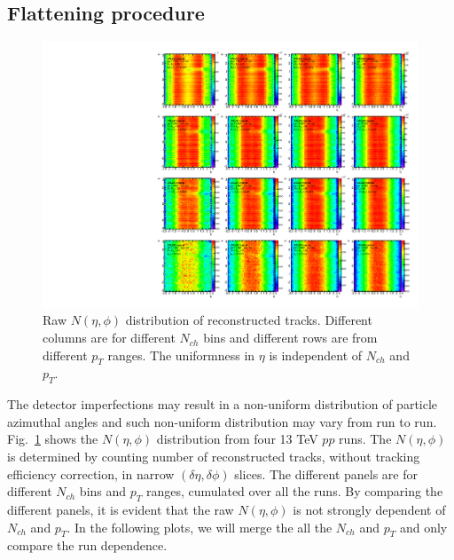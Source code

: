 \subsection{Flattening procedure}
\begin{figure}[H]
\centering
\includegraphics[width=1.\linewidth]{figs/sec_ana/flatten_pp13_2D_wPt.pdf}
\caption{Raw $N(\eta,\phi)$ distribution of reconstructed tracks. Different columns are for different $N_{ch}$ bins and different rows are from different $p_{T}$ ranges. The uniformness in $\eta$ is independent of $N_{ch}$ and $p_{T}$.}
\label{fig:flatten_pp13_2D_wPt}
\end{figure}
The detector imperfections may result in a non-uniform distribution of particle azimuthal angles and such non-uniform distribution may vary from run to run. Fig.~\ref{fig:flatten_pp13_2D_wPt} shows the $N(\eta,\phi)$ distribution from four 13 TeV $pp$ runs. The $N(\eta,\phi)$ is determined by counting number of reconstructed tracks, without tracking efficiency correction, in narrow $(\delta\eta,\delta\phi)$ slices. The different panels are for different $N_{ch}$ bins and $p_{T}$ ranges, cumulated over all the runs. By comparing the different panels, it is evident that the raw $N(\eta,\phi)$ is not strongly dependent of $N_{ch}$ and $p_{T}$. In the following plots, we will merge the all the $N_{ch}$ and $p_{T}$ and only compare the run dependence.

